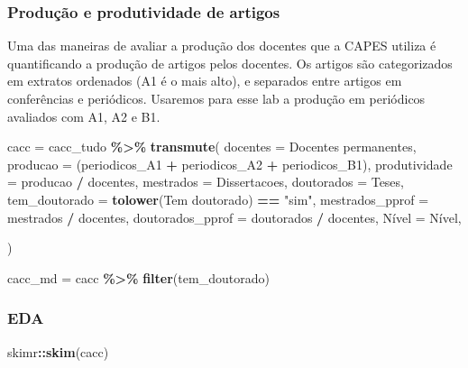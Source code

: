\documentclass[
]{article}
\newenvironment{Shaded}{\begin{snugshade}}{\end{snugshade}}
\newcommand{\AttributeTok}[1]{\textcolor[rgb]{0.13,0.29,0.53}{#1}}
\newcommand{\FunctionTok}[1]{\textcolor[rgb]{0.13,0.29,0.53}{\textbf{#1}}}
\newcommand{\NormalTok}[1]{#1}
\newcommand{\OtherTok}[1]{\textcolor[rgb]{0.56,0.35,0.01}{#1}}
\newcommand{\SpecialCharTok}[1]{\textcolor[rgb]{0.81,0.36,0.00}{\textbf{#1}}}
\newcommand{\StringTok}[1]{\textcolor[rgb]{0.31,0.60,0.02}{#1}}
\begin{document}
\hypertarget{produuxe7uxe3o-e-produtividade-de-artigos}{%
\subsubsection{Produção e produtividade de
artigos}\label{produuxe7uxe3o-e-produtividade-de-artigos}}

Uma das maneiras de avaliar a produção dos docentes que a CAPES utiliza
é quantificando a produção de artigos pelos docentes. Os artigos são
categorizados em extratos ordenados (A1 é o mais alto), e separados
entre artigos em conferências e periódicos. Usaremos para esse lab a
produção em periódicos avaliados com A1, A2 e B1.

\begin{Shaded}
\begin{Highlighting}[]
\NormalTok{cacc }\OtherTok{=}\NormalTok{ cacc\_tudo }\SpecialCharTok{\%\textgreater{}\%}
  \FunctionTok{transmute}\NormalTok{(}
    \AttributeTok{docentes =} \StringTok{\textasciigrave{}}\AttributeTok{Docentes permanentes}\StringTok{\textasciigrave{}}\NormalTok{,}
    \AttributeTok{producao =}\NormalTok{ (periodicos\_A1 }\SpecialCharTok{+}\NormalTok{ periodicos\_A2 }\SpecialCharTok{+}\NormalTok{ periodicos\_B1),}
    \AttributeTok{produtividade =}\NormalTok{ producao }\SpecialCharTok{/}\NormalTok{ docentes,}
    \AttributeTok{mestrados =}\NormalTok{ Dissertacoes,}
    \AttributeTok{doutorados =}\NormalTok{ Teses,}
    \AttributeTok{tem\_doutorado =} \FunctionTok{tolower}\NormalTok{(}\StringTok{\textasciigrave{}}\AttributeTok{Tem doutorado}\StringTok{\textasciigrave{}}\NormalTok{) }\SpecialCharTok{==} \StringTok{"sim"}\NormalTok{,}
    \AttributeTok{mestrados\_pprof =}\NormalTok{ mestrados }\SpecialCharTok{/}\NormalTok{ docentes,}
    \AttributeTok{doutorados\_pprof =}\NormalTok{ doutorados }\SpecialCharTok{/}\NormalTok{ docentes,}
\NormalTok{    Nível }\OtherTok{=}\NormalTok{ Nível,}
    
\NormalTok{  )}

\NormalTok{cacc\_md }\OtherTok{=}\NormalTok{ cacc }\SpecialCharTok{\%\textgreater{}\%} 
  \FunctionTok{filter}\NormalTok{(tem\_doutorado)}
\end{Highlighting}
\end{Shaded}

\hypertarget{eda}{%
\subsubsection{EDA}\label{eda}}

\begin{Shaded}
\begin{Highlighting}[]
\NormalTok{skimr}\SpecialCharTok{::}\FunctionTok{skim}\NormalTok{(cacc)}
\end{Highlighting}
\end{Shaded}
\end{document}
